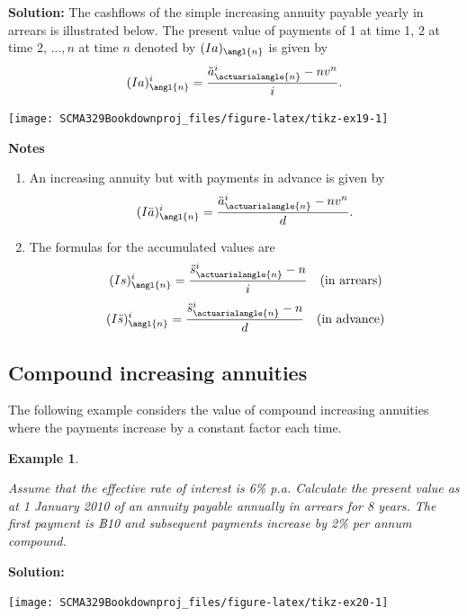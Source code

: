 \documentclass[
]{book}
\theoremstyle{definition}
\theoremstyle{definition}
\newtheorem{example}{Example}[chapter]
\theoremstyle{definition}
\theoremstyle{definition}
\theoremstyle{remark}
\begin{document}
\textbf{Solution:} The cashflows of the simple increasing annuity payable
yearly in arrears is illustrated below. The present value of payments of
1 at time 1, 2 at time 2, \(\ldots, n\) at time \(n\) denoted by
\((Ia)_\angl{n}\) is given by
\[(Ia)^{i}_\angl{n}   = \frac{\ddot{a}^{i}_{\actuarialangle{n}} - nv^n}{i}.\]

\begin{center}\texttt{[image: SCMA329Bookdownproj\_files/figure-latex/tikz-ex19-1]} \end{center}

\textbf{Notes}

\begin{enumerate}
\def\labelenumi{\arabic{enumi}.}
\item
  An increasing annuity but with payments in advance is given by
  \[(I\ddot{a})^{i}_\angl{n}   = \frac{\ddot{a}^{i}_{\actuarialangle{n}} - nv^n}{d}.\]
\item
  The formulas for the accumulated values are
  \[(Is)^{i}_\angl{n} = \frac{\ddot{s}^{i}_{\actuarialangle{n}} - n}{i} \quad\text{(in arrears)}\]
  \[(I\ddot{s})^{i}_\angl{n} = \frac{\ddot{s}^{i}_{\actuarialangle{n}} - n}{d} \quad\text{(in advance)}\]
\end{enumerate}

\hypertarget{compound-increasing-annuities}{%
\subsection{Compound increasing annuities}\label{compound-increasing-annuities}}

The following example considers the value of compound increasing
annuities where the payments increase by a constant factor each time.

\begin{example}
\protect\hypertarget{exm:unlabeled-div-36}{}\label{exm:unlabeled-div-36}

\emph{Assume that the effective rate of interest is 6\% p.a. Calculate the
present value as at 1 January 2010 of an annuity payable annually in
arrears for 8 years. The first payment is ฿10 and subsequent payments
increase by 2\% per annum compound.}

\end{example}

\textbf{Solution:}

\begin{center}\texttt{[image: SCMA329Bookdownproj\_files/figure-latex/tikz-ex20-1]} \end{center}
\end{document}
